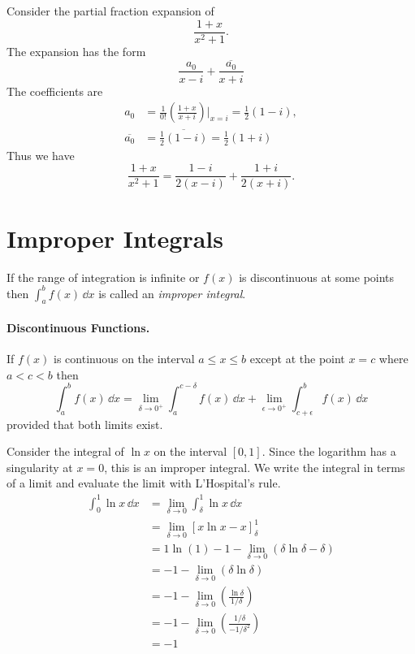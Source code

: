 \begin{Example}
  Consider the partial fraction expansion of
  \[
  \frac{1+x}{x^2+1}.
  \]
  The expansion has the form
  \[
  \frac{a_0}{x-i} + \frac{\overline{a_0}}{x+i}
  \]
  The coefficients are
  \begin{align*}
    a_0     &= \frac{1}{0!} \left(\frac{1+x}{x+i} \right)
    \bigg|_{x=i} = \frac{1}{2}(1-i), \\
    \overline{a_0} &= \overline{ \frac{1}{2}(1-i)} = \frac{1}{2}(1+i)
  \end{align*}
  Thus we have
  \[
  \frac{1+x}{x^2+1} = \frac{1-i}{2(x-i)} + \frac{1+i}{2(x+i)}.
  \]
\end{Example}











\section{Improper Integrals}


If the range of integration is infinite or $f(x)$ is discontinuous at 
some points then $\int_a^b f(x) \,\dd x$ is called an \textit{improper
  integral}.  


\paragraph{Discontinuous Functions.}
If $f(x)$ is continuous on the interval $a \leq x \leq b$ 
except at the point $x=c$ where $a < c < b$ then
\[
\int_a^b f(x)\,\dd x = \lim_{\delta \to 0^+} \int_a^{c-\delta} f(x)\,\dd x
+ \lim_{\epsilon \to 0^+} \int_{c+\epsilon}^b f(x)\,\dd x
\]
provided that both limits exist.


\begin{Example}
  Consider the integral of $\ln x$ on the interval $[0,1]$.  Since the logarithm
  has a singularity at $x = 0$, this is an improper integral.  We write the
  integral in terms of a limit and evaluate the limit with L'Hospital's rule.
  \begin{align*}
    \int_0^1 \ln x \,\dd x
    &= \lim_{\delta \to 0} \int_\delta^1 \ln x \,\dd x \\
    &= \lim_{\delta \to 0} [x \ln x - x]_\delta^1 \\
    &= 1 \ln(1) - 1 - \lim_{\delta \to 0} (\delta \ln \delta - \delta )\\
    &= -1 - \lim_{\delta \to 0} (\delta \ln \delta ) \\
    &= -1 - \lim_{\delta \to 0} \left( \frac{ \ln \delta }{1/\delta } 
    \right) \\
    &= -1 - \lim_{\delta \to 0} \left( \frac{ 1 / \delta }{-1/\delta^2 } 
    \right) \\
    &= -1
  \end{align*}
\end{Example}




